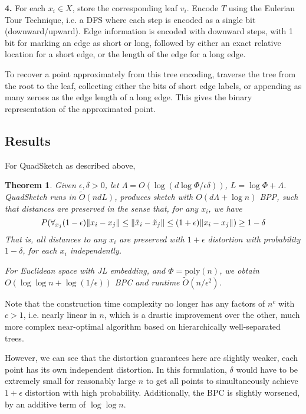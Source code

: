 \documentclass{article}
\newtheorem{theorem}{Theorem}
\begin{document}
\textbf{4.} For each $x_i \in X$, store the corresponding leaf $v_i$. Encode $T$
using the Eulerian Tour Technique, i.e. a DFS where each step is encoded as a
single bit (downward/upward). Edge information is encoded with downward steps,
with 1 bit for marking an edge as short or long, followed by either an exact
relative location for a short edge, or the length of the edge for a long edge.

To recover a point approximately from this tree encoding, traverse the tree from
the root to the leaf, collecting either the bits of short edge labels, or
appending as many zeroes as the edge length of a long edge. This gives the
binary representation of the approximated point.

\subsection{Results}

For QuadSketch as described above,

\begin{theorem}\label{thm7}
  Given $\epsilon, \delta > 0$, let $\Lambda = O(\log(d \log \Phi / \epsilon \delta))$, $L = \log \Phi + \Lambda$.
  QuadSketch runs in $\tilde{O}(ndL)$, produces sketch with $O(d\Lambda + \log n)$
  BPP, such that distances are preserved in the sense that, for any $x_i$, we
  have
  $$P(\forall_{x_j} (1 - \epsilon)\norm{x_i - x_j} \leq \norm{\tilde{x}_i - \tilde{x}_j} \leq
  (1 + \epsilon) \norm{x_i - x_j}) \geq 1 - \delta$$
  That is, all distances to any $x_i$ are preserved with $1+\epsilon$ distortion with
  probability $1 - \delta$, for each $x_i$ independently.

  For Euclidean space with JL embedding, and $\Phi = \mathrm{poly}(n)$, we obtain
  $O(\log \log n + \log (1/\epsilon))$ BPC and runtime $\tilde{O}(n/\epsilon^2)$.
\end{theorem}

Note that the construction time complexity no longer has any factors of $n^c$
with $c > 1$, i.e. nearly linear in $n$, which is a drastic improvement over the
other, much more complex near-optimal algorithm based on hierarchically
well-separated trees.

However, we can see that the distortion guarantees here are slightly weaker,
each point has its own independent distortion. In this formulation, $\delta$ would
have to be extremely small for reasonably large $n$ to get all points to
simultaneously achieve $1 + \epsilon$ distortion with high probability. Additionally,
the BPC is slightly worsened, by an additive term of $\log \log n$.
\end{document}
